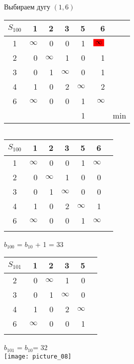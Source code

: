\documentclass[12pt]{article}
\begin{document}
Выбираем дугу $(1,6)$

\begin{flushleft}
\begin{tabular}{c||rrrrr||c}
$S_{100}$ & 1 & 2 & 3 & 5 & 6 & \\
\hline
\hline
1 & $\infty$ & 0 & 0  & 1 & $\colorbox{red}{$\infty$}$ & \\
2 & 0 & $\infty$ & 1  & 0 & 1 & \\
3 & 0 & 1 & $\infty$  & 0 & 1 & \\
4 & 1 & 0 & 2  & $\infty$ & 2 & \\
6 & $\infty$ & 0 & 0  & 1 & $\infty$ & \\
\hline
\hline
 &  &   &    & 1 &  & min \\
\end{tabular}
$\qquad $ 
\begin{tabular}{c||rrrrr||c}
$S_{100}$ & 1 & 2 & 3 & 5 & 6 & \\
\hline
\hline
1 & $\infty$ & 0 & 0  & 1 & $\infty$ & \\
2 & 0 & $\infty$ & 1  & 0 & 0 & \\
3 & 0 & 1 & $\infty$  & 0 & 0 & \\
4 & 1 & 0 & 2  & $\infty$ & 1 & \\
6 & $\infty$ & 0 & 0  & 1 & $\infty$ & \\
\hline
\hline
 &  &  &  &  &  & \\
\end{tabular}
\end{flushleft}

$b_{100}$ = $b_{10}$ + 1 = 33\\

\begin{flushleft}
\begin{tabular}{c||rrrr||c}
$S_{101}$ & 1 & 2 & 3 & 5 &  \\
\hline
\hline
2 & 0 & $\infty$ & 1  & 0 &  \\
3 & 0 & 1 & $\infty$  & 0 &  \\
4 & 1 & 0 & 2  & $\infty$ &  \\
6 & $\infty$ & 0 & 0  & 1 &  \\
\hline
\hline
 &  &  &  &  &   \\
\end{tabular}
\end{flushleft}

$b_{101}$ = $b_{10}$= 32\\

\texttt{[image: picture\_08]}\\
\end{document}
